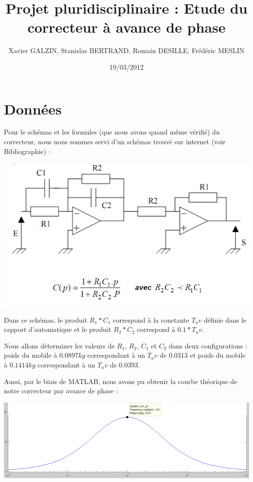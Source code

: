 \documentclass[11pt, french]{article} %
\title{Projet pluridisciplinaire : Etude du correcteur à avance de phase}
\author{Xavier GALZIN, Stanislas BERTRAND, Romain DESILLE, Frédéric MESLIN}
\date{19/03/2012}
\begin{document}
\maketitle

\pagebreak

\section{Données}

\noindent
Pour le schémas et les formules (que nous avons quand même vérifié) du correcteur, nous nous sommes servi d'un schémas trouvé sur internet (voir Bibliographie) :

\begin{center}
\includegraphics[width = 15cm]{Avph/Avph.png} 
\end{center}

\vspace{0.5cm}

Dans ce schémas, le produit $R_1*C_1$ correspond à la constante $ T_av$ définie dans le rapport d'automatique et le produit $R_2*C_2$ correspond à $0.1*T_av$.


Nous allons déterminer les valeurs de $R_1$, $R_2$, $C_1$ et $C_2$ dans deux configurations : poids du mobile à $0.0897 kg$ correspondant à un $T_av$ de 0.0313 et poids du mobile à $0.1414 kg$ correspondant à un $T_av$ de 0.0393.


Aussi, par le biais de MATLAB, nous avons pu obtenir la courbe théorique de notre correcteur par avance de phase :

\begin{center}
\includegraphics[width = 15cm]{Avph/aphmat.png} 
\end{center}
\end{document}
